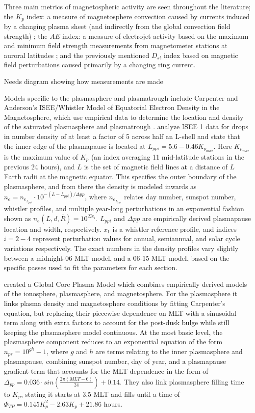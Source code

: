 Three main metrics of magnetospheric activity are seen throughout the literature; the $K_p$ index: a measure of magnetosphere convection caused by currents induced by a changing plasma sheet (and indirectly from the global convection field strength) \citep{Thomsen2004WhyKpSoGood}; the $AE$ index: a measure of electrojet activity based on the maximum and minimum field strength measurements from magnetometer stations at auroral latitudes \citep{DavisSugiura1966AE}; and the previously mentioned $D_{st}$ index based on magnetic field perturbations caused primarily by a changing ring current.

\note Needs diagram showing how measurements are made

Models specific to the plasmasphere and plasmatrough include Carpenter and Anderson's ISEE/Whistler Model of Equatorial Electron Density in the Magnetosphere, which use empirical data to determine the location and density of the saturated plasmasphere and plasmatrough \citep{Carpenter1992ISEEModel}. \cite{Carpenter1992ISEEModel} analyze ISEE 1 data for drops in number density of at least a factor of 5 across half an L-shell and state that the inner edge of the plasmapause is located at $L_{ppi}=5.6-0.46K_{p_{max}}$. Here $K_{p_{max}}$ is the maximum value of $K_p$ (an index averaging 11 mid-latitude stations in the previous 24 hours), and $L$ is the set of magnetic field lines at a distance of $L$ Earth radii at the magnetic equator. This specifies the outer boundary of the plasmasphere, and from there the density is modeled inwards as $n_e=n_{e_{L_{ppi}}}\cdot 10^{-(L-L_{ppi})/\Delta pp}$, where $n_{e_{L_{ppi}}}$ relates day number, sunspot number, whistler profiles, and multiple year-long perturbations in an exponential fashion shown as $n_e(L,d,\bar{R})=10^{\Sigma x_i}$. $L_{ppi}$ and $\Delta pp$ are empirically derived plasmapause location and width, respectively. $x_1$ is a whistler reference profile, and indices $i=2-4$ represent perturbation values for annual, semiannual, and solar cycle variations respectively. The exact numbers in the density profiles vary slightly between a midnight-06 MLT model, and a 06-15 MLT model, based on the specific passes used to fit the parameters for each section. 

\cite{Gallagher2000GlobalCore} created a Global Core Plasma Model which combines empirically derived models of the ionosphere, plasmasphere, and magnetosphere. For the plasmasphere it links plasma density and magnetosphere conditions by fitting Carpenter's equation, but replacing their piecewise dependence on MLT with a sinusoidal term along with extra factors to account for the post-dusk bulge while still keeping the plasmasphere model continuous. At the most basic level, the plasmasphere component reduces to an exponential equation of the form $n_{ps}=10^{gh}-1$, where $g$ and $h$ are terms relating to the inner plasmasphere and plasmapause, combining sunspot number, day of year, and a plasmapause gradient term that accounts for the MLT dependence in the form of $\Delta_{pp}=0.036\cdot sin(\frac{2\pi (MLT-6)}{24})+0.14$. They also link plasmasphere filling time to $K_p$, stating it starts at 3.5 MLT and fills until a time of $\Phi_{TP}=0.145K_p^2-2.63K_p+21.86$ hours\cite{Gallagher1995AzimuthalVariation}.

